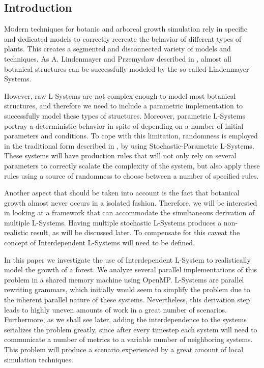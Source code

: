 \documentclass[letterpaper,twoside,11pt]{article}
\begin{document}
\begin{multicols}{2} %

\section{Introduction}
\lettrine[nindent=0em,lines=2]{M}
odern techniques for botanic and arboreal growth simulation rely in specific and dedicated models to correctly recreate the behavior of different types of plants. This creates a segmented and disconnected variety of models and techniques. As A. Lindenmayer and Przemyslaw described in \cite{Prusinkiewicz:1996:ABP:235579}, almost all botanical structures can be successfully modeled by the so called Lindenmayer Systems.

However, raw L-Systems are not complex enough to model most botanical structures, and therefore we need to include a parametric implementation to successfully model these types of structures. Moreover, parametric L-Systems portray a deterministic behavior in spite of depending on a number of initial parameters and conditions. To cope with this limitation, randomness is employed in the traditional form described in \cite{Prusinkiewicz:1996:ABP:235579}, by using Stochastic-Parametric L-Systems. These systems will have production rules that will not only rely on several parameters to correctly scalate the complexity of the system, but  also apply these rules using a source of randomness to choose between a number of specified rules.

Another aspect that should be taken into account is the fact that botanical growth almost never occurs in a isolated fashion. Therefore, we will be interested in looking at a framework that can accommodate the simultaneous derivation of multiple L-Systems. Having multiple stochastic L-Systems produces a non-realistic result, as will be discussed later. To compensate for this caveat the concept of Interdependent L-Systems will need to be defined.

In this paper we investigate the use of Interdependent L-System to realistically model the growth of a forest. We analyze several parallel implementations of this problem in a shared memory machine using OpenMP. L-Systems are parallel rewriting grammars, which initially would seem to simplify the problem due to the inherent parallel nature of these systems. Nevertheless, this derivation step leads to highly uneven amounts of work in a great number of scenarios. Furthermore, as we shall see later, adding the interdependence to the systems serializes the problem greatly, since after every timestep each system will need to communicate a number of metrics to a variable number of neighboring systems. This problem will produce a scenario experienced by a great amount of local simulation techniques.


\end{multicols}
\end{document}
